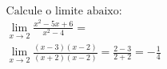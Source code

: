 \begin{ex}
\begin{align}
&\text{Calcule o limite abaixo:}\nonumber\\
&\lim_{x\rightarrow 2} \frac{x^2-5x+6}{x^2-4}=\nonumber\\
&\lim_{x\rightarrow 2} \frac{(x-3)(x-2)}{(x+2)(x-2)}=\frac{2-3}{2+2}=-\frac{1}{4}\nonumber
\end{align}
\end{ex}
